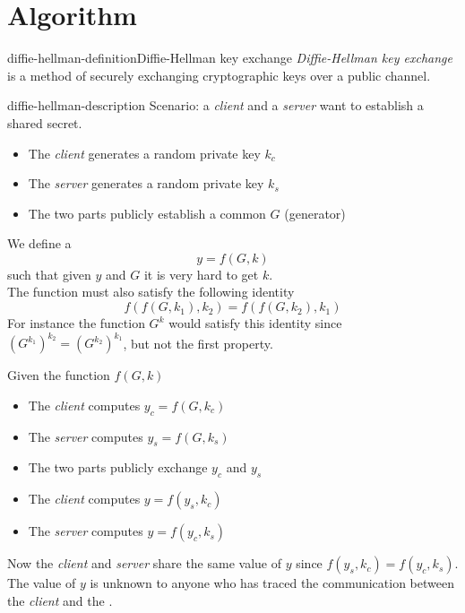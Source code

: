 \documentclass[preview]{standalone}
\begin{document}
\genpage

\section{Algorithm}

\begin{snippetdefinition}{diffie-hellman-definition}{Diffie-Hellman key exchange}
    \textit{Diffie-Hellman key exchange} is a method of securely exchanging
    cryptographic keys over a public channel.
\end{snippetdefinition}

\begin{snippet}{diffie-hellman-description}
Scenario: a \textit{client} and a \textit{server} want to establish a shared secret.
\begin{itemize}
    \item The \textit{client} generates a random private key \(k_c\)
    \item The \textit{server} generates a random private key \(k_s\)
    \item The two parts publicly establish a common \(G\) (generator)
\end{itemize}

We define a \function
\[
    y=f(G,k)
\]
such that given \(y\) and \(G\) it is very hard to get \(k\).\\
The function must also satisfy the following identity
\[
    f(f(G, k_1), k_2)=f(f(G, k_2), k_1)
\]
For instance the function \(G^k\) would satisfy this identity since \({\left(G^{k_1}\right)}^{k_2}={\left(G^{k_2}\right)}^{k_1}\), but not the first property.

Given the function \(f(G,k)\)
\begin{itemize}
    \item The \textit{client} computes \(y_c=f(G,k_c)\)
    \item The \textit{server} computes \(y_s=f(G,k_s)\)
    \item The two parts publicly exchange \(y_c\) and \(y_s\)
    \item The \textit{client} computes \(y=f(y_s,k_c)\)
    \item The \textit{server} computes \(y=f(y_c,k_s)\)
\end{itemize}
Now the \textit{client} and \textit{server} share the same value of \(y\) since \(f(y_s,k_c)=f(y_c,k_s)\).\\
The value of \(y\) is unknown to anyone who has traced the communication between the \textit{client} and the .
\end{snippet}
\end{document}
